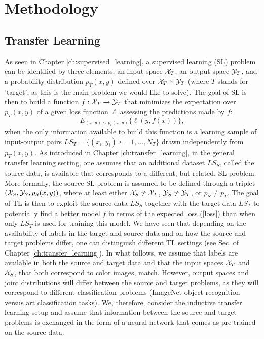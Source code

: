 \section{Methodology}
\label{sec:ch_4_methods}
\subsection{Transfer Learning}
\label{subsec:tl}

As seen in Chapter \ref{ch:supervised_learning}, a supervised learning (SL) problem can be identified by three elements: an input space ${\cal X}_T$, an output space ${\cal Y}_T$, and a probability distribution $p_T(x,y)$ defined over ${\cal X}_T\times {\cal Y}_T$ (where $T$ stands for 'target', as this is the main problem we would like to solve). The goal of SL is then to build a function $f:{\cal X}_T\rightarrow{\cal Y}_T$ that minimizes the expectation over $p_T(x,y)$ of a given loss function $\ell$ assessing the predictions made by $f$:
\begin{equation}\label{loss}
  E_{(x,y)\sim p_t(x,y)} \{\ell(y,f(x))\},
\end{equation}
when the only information available to build this function is a learning sample of input-output pairs $LS_T=\{(x_i,y_i)|i=1,\ldots,N_T\}$ drawn independently from $p_T(x,y)$. As introduced in Chapter \ref{ch:transfer_learning}, in the general transfer learning setting, one assumes that an additional dataset $LS_S$, called the source data, is available that corresponds to a different, but related, SL problem. More formally, the source SL problem is assumed to be defined through a triplet $({\cal X}_S,{\cal Y}_S,p_S(x,y))$, where at least either ${\cal X}_S\neq {\cal X}_T$, ${\cal Y}_S\neq {\cal Y}_T$, or $p_S\neq p_T$. The goal of TL is then to exploit the source data $LS_S$ together with the target data $LS_T$ to potentially find a better model $f$ in terms of the expected loss (\ref{loss}) than when only $LS_T$ is used for training this model.
We have seen that depending on the availability of labels in the target and source data and on how the source and target problems differ, one can distinguish different TL settings (see Sec. of Chapter \ref{ch:transfer_learning}). In what follows, we assume that labels are available in both the source and target data and that the input spaces ${\cal X}_T$ and ${\cal X}_S$, that both correspond to color images, match. However, output spaces and joint distributions will differ between the source and target problems, as they will correspond to different classification problems (ImageNet object recognition versus art classification tasks). We, therefore, consider the inductive transfer learning setup and assume that information between the source and target problems is exchanged in the form of a neural network that comes as pre-trained on the source data. 

